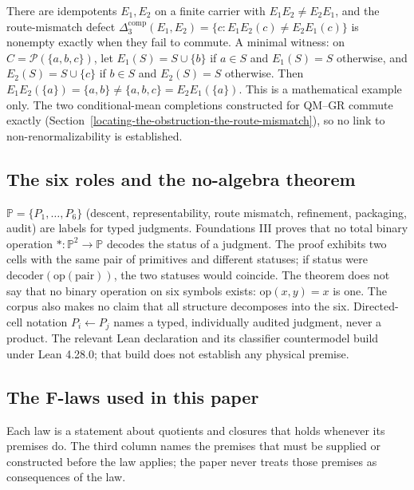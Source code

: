 There are idempotents \(E_1,E_2\) on a finite carrier with \(E_1E_2\neq E_2E_1\), and the route-mismatch defect
\(\Delta_3^{\mathrm{comp}}(E_1,E_2)=\{c: E_1E_2(c)\neq E_2E_1(c)\}\) is nonempty exactly when they fail to commute. A
minimal witness: on \(C=\mathcal P(\{a,b,c\})\), let \(E_1(S)=S\cup\{b\}\) if \(a\in S\) and \(E_1(S)=S\) otherwise, and
\(E_2(S)=S\cup\{c\}\) if \(b\in S\) and \(E_2(S)=S\) otherwise. Then \(E_1E_2(\{a\})=\{a,b\}\neq\{a,b,c\}=E_2E_1(\{a\})\).
This is a mathematical example only. The two conditional-mean completions constructed for QM--GR commute exactly
(Section~\ref{locating-the-obstruction-the-route-mismatch}), so no link to non-renormalizability is established.

\subsection{The six roles and the no-algebra theorem}\label{the-six-primitives-and-the-no-algebra-theorem}

\(\mathbb P=\{P_1,\dots,P_6\}\) (descent, representability, route mismatch, refinement, packaging, audit) are labels for
typed judgments. Foundations III proves that no total binary operation \(*:\mathbb P^2\to\mathbb P\) decodes the status
of a judgment. The proof exhibits two cells with the same pair of primitives and different statuses; if status were
\(\mathrm{decoder}(\mathrm{op}(\text{pair}))\), the two statuses would coincide. The theorem does not say that no
binary operation on six symbols exists: \(\mathrm{op}(x,y)=x\) is one. The corpus also makes no claim that all
structure decomposes into the six. Directed-cell notation \(P_i\leftarrow P_j\) names a typed, individually audited
judgment, never a product. The relevant Lean declaration and its classifier countermodel build under Lean 4.28.0;
that build does not establish any physical premise.

\subsection{The F-laws used in this paper}\label{the-f-laws-used-in-this-paper-one-line-formal-cores}

Each law is a statement about quotients and closures that holds whenever its premises do. The third column names the
premises that must be supplied or constructed before the law applies; the paper never treats those premises as
consequences of the law.

